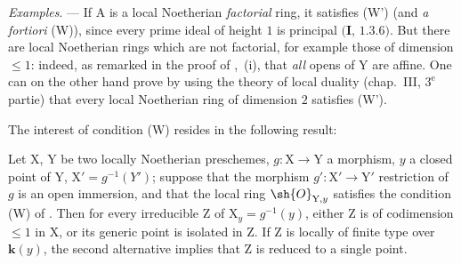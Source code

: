 \begin{env}[21.12.9]
\label{IV.21.12.9}
\emph{Examples}. ---
If $\mathrm{A}$ is a local Noetherian \emph{factorial} ring, it satisfies (W') (and \emph{a fortiori} (W)), since every prime ideal of height $1$ is principal $(\mathbf{I}$, $1.3.6)$.
But there are local Noetherian rings which are not factorial, for example those of dimension $\leq 1$: indeed, as remarked in the proof of ,~(i), that \emph{all} opens of $\mathrm{Y}$ are affine.
One can on the other hand prove by using the theory of local duality (chap.~III, $3^{\text{e}}$ partie) that every local Noetherian ring of dimension $2$ satisfies (W').
\end{env}

The interest of condition (W) resides in the following result:
\begin{proposition}[21.12.10]
\label{IV.21.12.10}
Let $\mathrm{X}$, $\mathrm{Y}$ be two locally Noetherian preschemes, $g:\mathrm{X}\to\mathrm{Y}$ a morphism, $y$ a closed point of $\mathrm{Y}$, $\mathrm{X}'=g^{-1}(Y')$; suppose that the morphism $g':\mathrm{X}'\to\mathrm{Y}'$ restriction of $g$ is an open immersion, and that the local ring $\sh{O}_{\mathrm{Y},y}$ satisfies the condition \textup{(W)} of .
Then for every irreducible $\mathrm{Z}$ of $\mathrm{X}_y=g^{-1}(y)$, either $\mathrm{Z}$ is of codimension $\leq 1$ in $\mathrm{X}$, or its generic point is isolated in $\mathrm{Z}$.
If $\mathrm{Z}$ is locally of finite type over $\boldsymbol{k}(y)$, the second alternative implies that $\mathrm{Z}$ is reduced to a single point.
\end{proposition}


